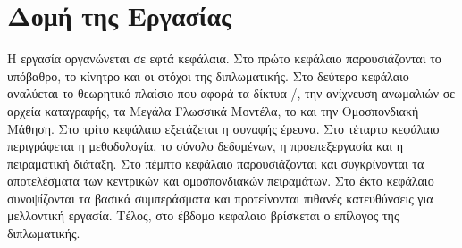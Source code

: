 \section{Δομή της Εργασίας}

Η εργασία οργανώνεται σε εφτά κεφάλαια. Στο πρώτο κεφάλαιο παρουσιάζονται το υπόβαθρο, το κίνητρο και οι στόχοι της διπλωματικής. Στο δεύτερο κεφάλαιο αναλύεται το θεωρητικό πλαίσιο που αφορά τα δίκτυα /, την ανίχνευση ανωμαλιών σε αρχεία καταγραφής, τα Μεγάλα Γλωσσικά Μοντέλα, το  και την Ομοσπονδιακή Μάθηση. Στο τρίτο κεφάλαιο εξετάζεται η συναφής έρευνα. Στο τέταρτο κεφάλαιο περιγράφεται η μεθοδολογία, το σύνολο δεδομένων, η προεπεξεργασία και η πειραματική διάταξη. Στο πέμπτο κεφάλαιο παρουσιάζονται και συγκρίνονται τα αποτελέσματα των κεντρικών και ομοσπονδιακών πειραμάτων. Στο έκτο κεφάλαιο συνοψίζονται τα βασικά συμπεράσματα και προτείνονται πιθανές κατευθύνσεις για μελλοντική εργασία. Τέλος, στο έβδομο κεφαλαιο βρίσκεται ο επίλογος της διπλωματικής.